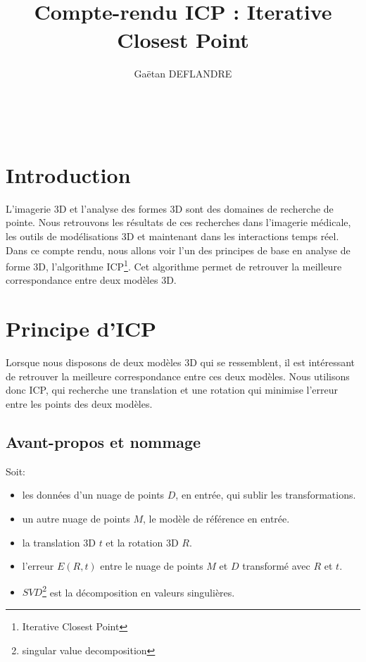 \documentclass[a4paper,11pt]{article}
\title{
  \noindent\hrulefill \\
  \vspace{10mm} Compte-rendu ICP : Iterative Closest Point
}
\author{Gaëtan DEFLANDRE}
\begin{document}
\maketitle

\noindent\hrulefill \\


\section{Introduction}

L'imagerie 3D et l'analyse des formes 3D sont des domaines de recherche 
de pointe. Nous retrouvons les résultats de ces recherches dans 
l'imagerie médicale, les outils de modélisations 3D et maintenant dans 
les interactions temps réel.\\

Dans ce compte rendu, nous allons voir l'un des principes de base en 
analyse de forme 3D, l'algorithme ICP\footnote{Iterative Closest Point}. 
Cet algorithme permet de retrouver la meilleure correspondance entre 
deux modèles 3D.\\

\newpage

\section{Principe d'ICP}

Lorsque nous disposons de deux modèles 3D qui se ressemblent, il est 
intéressant de retrouver la meilleure correspondance entre ces deux 
modèles. Nous utilisons donc ICP\cite{121791}, qui recherche une 
translation et une rotation qui minimise l'erreur entre les points 
des deux modèles.\\

\subsection{Avant-propos et nommage}

Soit:
\begin{itemize}
  \item les données d'un nuage de points $D$, en entrée, qui sublir les
  transformations.
  \item un autre nuage de points $M$, le modèle de référence en entrée.
  \item la translation 3D $t$ et la rotation 3D $R$.
  \item l'erreur $E(R,t)$ entre le nuage de points $M$ et $D$ transformé 
  avec $R$ et $t$.
  \item $SVD$\footnote{singular value decomposition} est la 
  décomposition en valeurs singulières.\\
\end{itemize}
\end{document}
